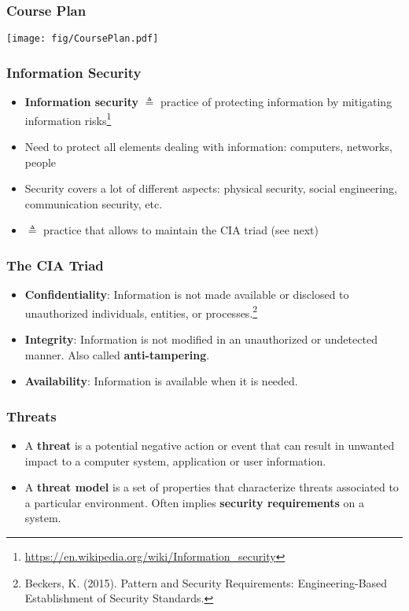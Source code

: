 \documentclass[
hyperref={pdfpagelabels=false}
,xcolor=table
]
{beamer}
\begin{document}
\begin{frame}
  \frametitle{Course Plan}

  \begin{center}
    \texttt{[image: fig/CoursePlan.pdf]}
  \end{center}  
\end{frame}


\begin{frame}
  \frametitle{Information Security}

  \begin{itemize}
  \item \textbf{Information security} $\triangleq$ practice of
    protecting information by mitigating information
    risks\footnote{\url{https://en.wikipedia.org/wiki/Information_security}}
  \item Need to protect all elements dealing with information: computers, networks, people
  \item Security covers a lot of different aspects:  physical security, social engineering, communication security, etc. 
  \item $\triangleq$ practice that allows to maintain the CIA triad (see next)
  \end{itemize}
\end{frame}


\begin{frame}
  \frametitle{The CIA Triad}
  \begin{itemize}
  \item \textbf{Confidentiality}: Information is not made available or
    disclosed to unauthorized individuals, entities, or
    processes.\footnote{Beckers, K. (2015). Pattern and Security
      Requirements: Engineering-Based Establishment of Security
      Standards.}
  \item \textbf{Integrity}: Information is not modified in an unauthorized or
    undetected manner. Also called \textbf{anti-tampering}.
  \item \textbf{Availability}: Information is available when it is needed.
  \end{itemize}
\end{frame}


\begin{frame}
  \frametitle{Threats}
  \begin{itemize}
  \item A \textbf{threat} is a potential negative action or event that can
    result in unwanted impact to a computer system, application or
    user information.
  \item A \textbf{threat model} is a set of properties that characterize
    threats associated to a particular environment. Often implies
    \textbf{security requirements} on a system. 
  \end{itemize}
\end{frame}
\end{document}
